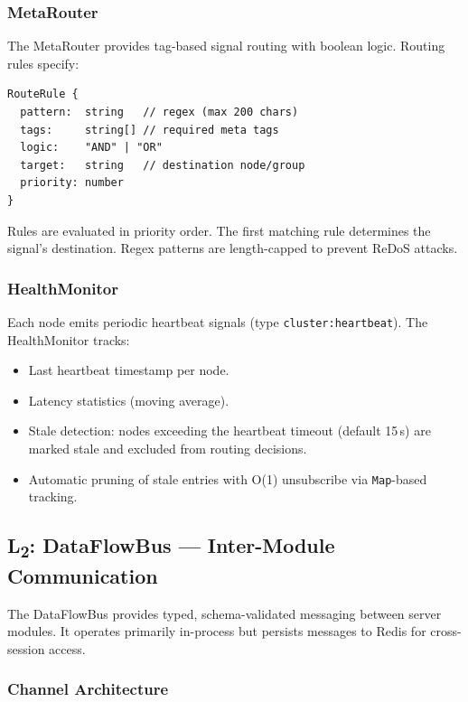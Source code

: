 \documentclass[journal,10pt]{IEEEtran}
\newcommand{\code}[1]{\texttt{#1}}
\newcommand{\layertwo}{L\textsubscript{2}}
\begin{document}
\subsubsection{MetaRouter}

The MetaRouter provides tag-based signal routing with boolean logic. Routing rules specify:

\begin{lstlisting}[language={}]
RouteRule {
  pattern:  string   // regex (max 200 chars)
  tags:     string[] // required meta tags
  logic:    "AND" | "OR"
  target:   string   // destination node/group
  priority: number
}
\end{lstlisting}

Rules are evaluated in priority order. The first matching rule determines the signal's destination. Regex patterns are length-capped to prevent ReDoS attacks.

\subsubsection{HealthMonitor}

Each node emits periodic heartbeat signals (type \code{cluster:heartbeat}). The HealthMonitor tracks:

\begin{itemize}[nosep]
\item Last heartbeat timestamp per node.
\item Latency statistics (moving average).
\item Stale detection: nodes exceeding the heartbeat timeout (default 15\,s) are marked stale and excluded from routing decisions.
\item Automatic pruning of stale entries with O(1) unsubscribe via \code{Map}-based tracking.
\end{itemize}

\subsection{\layertwo: DataFlowBus --- Inter-Module Communication}
\label{sec:l2}

The DataFlowBus provides typed, schema-validated messaging between server modules. It operates primarily in-process but persists messages to Redis for cross-session access.

\subsubsection{Channel Architecture}
\end{document}
